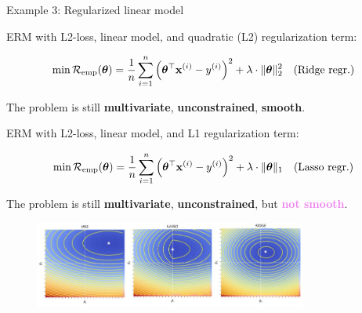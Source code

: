 \begin{vbframe}{Example 3: Regularized linear model}

ERM with L2-loss, linear model, and quadratic (L2) regularization term: 

\begin{footnotesize}
$$
	\min \mathcal{R}_{\text{emp}}(\bm{\theta}) = \frac{1}{n}\sum\limits_{i=1}^n \left(\bm{\theta}^\top \mathbf{x}^{(i)} - y^{(i)}\right)^2  + \lambda \cdot \|\bm{\theta}\|_2^2 \quad \text{(Ridge regr.)}
$$
\end{footnotesize}
\vspace*{-0.2cm}


The problem is still \textbf{multivariate}, \textbf{unconstrained}, \textbf{smooth}. 

\vspace*{0.2cm}

ERM with L2-loss, linear model, and L1 regularization term: 

\begin{footnotesize}
$$
	\min \mathcal{R}_{\text{emp}}(\bm{\theta}) = \frac{1}{n}\sum\limits_{i=1}^n \left(\bm{\theta}^\top \mathbf{x}^{(i)} - y^{(i)}\right)^2  + \lambda \cdot \|\bm{\theta}\|_1 \quad \text{(Lasso regr.)}
$$
\end{footnotesize}

\vspace*{-0.2cm}

The problem is still \textbf{multivariate}, \textbf{unconstrained}, but \textcolor{violet}{\textbf{not smooth}}. %

\vspace*{-0.2cm}

\begin{figure}
\begin{center}
	\includegraphics[width=0.8\textwidth]{figure_man/lasso-ridge_medium.jpg}
\end{center}
\end{figure}

\end{vbframe}



